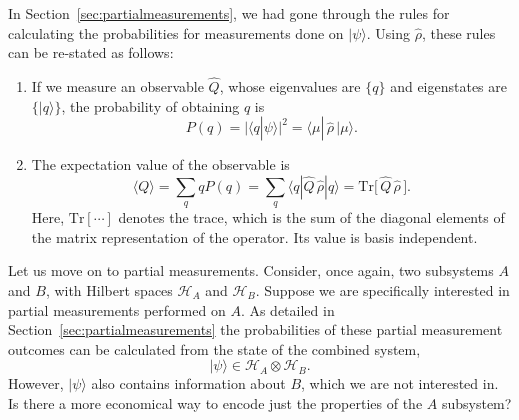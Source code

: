 \documentclass[prx,12pt]{revtex4-2}
\begin{document}
In Section~\ref{sec:partialmeasurements}, we had gone through the
rules for calculating the probabilities for measurements done on
$|\psi\rangle$.  Using $\hat{\rho}$, these rules can be re-stated as
follows:

\begin{enumerate}
\item If we measure an observable $\hat{Q}$, whose eigenvalues are
  $\{q\}$ and eigenstates are $\{|q\rangle\}$, the probability of
  obtaining $q$ is
  \begin{equation}
    P(q) = \big|\langle q | \psi\rangle\big|^2 =
    \langle \mu |\, \hat{\rho}\, | \mu \rangle.
    \label{Pi_rho}
  \end{equation}

\item The expectation value of the observable is
  \begin{equation}
    \langle Q\rangle
    = \sum_q q P(q)
    = \sum_q \langle q | \hat{Q}\, \hat{\rho}| q \rangle
    = \mathrm{Tr}\big[\,\hat{Q} \, \hat{\rho}\,\big].
    \label{Qexpt}
  \end{equation}
  Here, $\mathrm{Tr}[\cdots]$ denotes the trace, which is the sum of
  the diagonal elements of the matrix representation of the operator.
  Its value is basis independent.
\end{enumerate}

Let us move on to partial measurements.  Consider, once again, two
subsystems $A$ and $B$, with Hilbert spaces $\mathscr{H}_A$ and
$\mathscr{H}_B$.  Suppose we are specifically interested in partial
measurements performed on $A$.  As detailed in
Section~\ref{sec:partialmeasurements} the probabilities of these
partial measurement outcomes can be calculated from the state of the
combined system,
\begin{equation*}
  |\psi\rangle \in \mathscr{H}_A\otimes \mathscr{H}_B.
\end{equation*}
However, $|\psi\rangle$ also contains information about $B$, which we
are not interested in.  Is there a more economical way to encode just
the properties of the $A$ subsystem?
\end{document}
